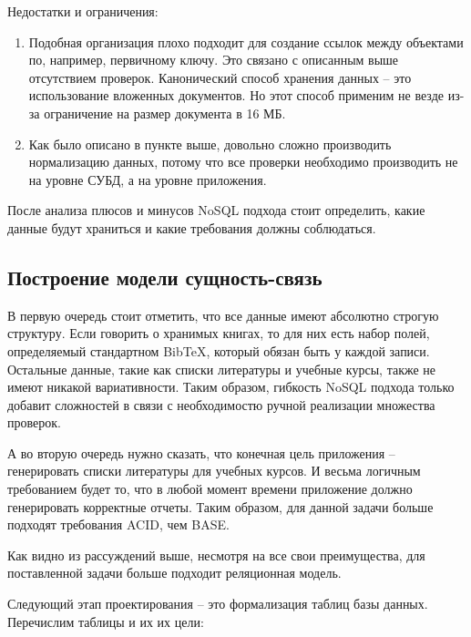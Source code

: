 Недостатки и ограничения:

\begin{enumerate}
    \item Подобная организация плохо подходит для создание ссылок между объектами по, например,
        первичному ключу. Это связано с описанным выше отсутствием проверок. Канонический
        способ хранения данных -- это использование вложенных документов. Но этот способ
        применим не везде из-за ограничение на размер документа в 16 МБ.
    \item Как было описано в пункте выше, довольно сложно производить нормализацию
        данных, потому что все проверки необходимо производить не на уровне СУБД, а
        на уровне приложения.
\end{enumerate}

После анализа плюсов и минусов NoSQL подхода стоит определить, какие данные будут храниться
и какие требования должны соблюдаться.

\subsection*{Построение модели сущность-связь}

В первую очередь стоит отметить, что все данные имеют абсолютно строгую структуру. Если говорить
о хранимых книгах, то для них есть набор полей, определяемый стандартном BibTeX, который обязан
быть у каждой записи. Остальные данные, такие как списки литературы и учебные курсы, также не имеют
никакой вариативности. Таким образом, гибкость NoSQL подхода только добавит сложностей в связи
с необходимостю ручной реализации множества проверок.

А во вторую очередь нужно сказать, что конечная цель приложения -- генерировать списки литературы
для учебных курсов. И весьма логичным требованием будет то, что в любой момент времени приложение
должно генерировать корректные отчеты. Таким образом, для данной задачи больше подходят требования
ACID, чем BASE.

Как видно из рассуждений выше, несмотря на все свои преимущества, для поставленной задачи больше
подходит реляционная модель.

Следующий этап проектирования -- это формализация таблиц базы данных. Перечислим таблицы и их
их цели:

